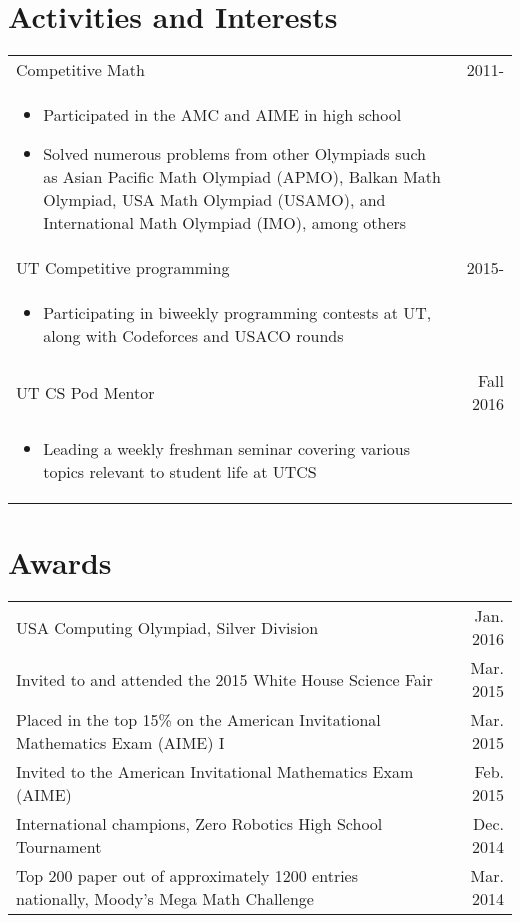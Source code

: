 \documentclass[9pt]{extarticle}
\begin{document}
\section*{Activities and Interests}
\begin{tabularx}{\textwidth}{X r }
    Competitive Math & 2011- \\
    \vspace{-2mm}
    \begin{itemize}[noitemsep,topsep=0pt]
        \item Participated in the AMC and AIME in high school
        \item Solved numerous problems from other Olympiads
                such as Asian Pacific Math Olympiad (APMO), Balkan Math Olympiad, USA Math Olympiad (USAMO),
                and International Math Olympiad (IMO), among others
    \end{itemize} & \\
    UT Competitive programming & 2015- \\
    \vspace{-2mm}
    \begin{itemize}[noitemsep,topsep=0pt]
        \item Participating in biweekly programming contests at UT, along with Codeforces and USACO rounds
    \end{itemize} & \\
    UT CS Pod Mentor & Fall 2016 \\
    \vspace{-2mm}
    \begin{itemize}[noitemsep,topsep=0pt]
        \item Leading a weekly freshman seminar covering various topics relevant to student life at UTCS
    \end{itemize} & \\
\end{tabularx}

\section*{Awards}
\begin{tabularx}{\textwidth}{X r }
    USA Computing Olympiad, Silver Division & Jan. 2016 \\
    Invited to and attended the 2015 White House Science Fair & Mar. 2015 \\
    Placed in the top 15\% on the American Invitational Mathematics Exam (AIME) I & Mar. 2015 \\
    Invited to the American Invitational Mathematics Exam (AIME)  & Feb. 2015 \\
    International champions, Zero Robotics High School Tournament & Dec. 2014 \\
    Top 200 paper out of approximately 1200 entries nationally, Moody's Mega Math Challenge & Mar. 2014 \\
\end{tabularx}
\end{document}
